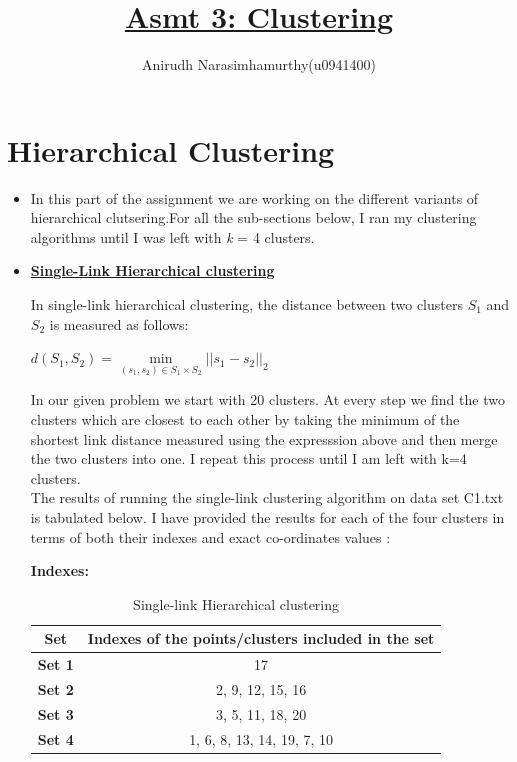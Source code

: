 \documentclass[11pt]{article}
\title{\textbf{\underline{Asmt 3: Clustering}}}
\author{Anirudh Narasimhamurthy(u0941400)}
\begin{document}
\maketitle

\section{Hierarchical Clustering}

\begin{itemize}
	
	
	\item[] In this part of the assignment we are working on the different variants of hierarchical clutsering.For all the sub-sections below, I ran my clustering algorithms until I was left with \emph{k} = 4 clusters. 
	
	\item[] \underline{\textbf{Single-Link Hierarchical clustering}}
	
	In single-link hierarchical clustering, the distance between two clusters $S_1$ and $S_2$ is measured as follows:
	\begin{center}
		$d(S_1,S_2)= \underset{(s_1,s_2) \in S_1 \times S_2}{\min} || s_1 -s_2||_2$
	\end{center}
	
	In our given problem we start with 20 clusters. At every step we find the two clusters which are closest to each other by taking the minimum of the shortest link distance measured using the expresssion above and then merge the two clusters into one. I repeat this process until I am left with k=4 clusters.\\
	
	The results of running the single-link clustering algorithm on data set C1.txt is tabulated below. I have provided the results for each of the four clusters in terms of both their indexes and exact co-ordinates values :
	
	\textbf{Indexes:}
	
	\begin{table}[h]
		\centering
		\begin{tabular}{|c|c|}
			\hline
			\textbf{Set}  & \textbf{Indexes of the points/clusters included in the set} \\
			\hline
			\textbf{Set 1}  & 17\\
			\hline
			\textbf{Set 2} & 2, 9, 12, 15, 16   \\
			\hline
			\textbf{Set 3} &  3, 5, 11, 18, 20    \\
			\hline
			\textbf{Set 4}  & 1, 6, 8, 13, 14, 19, 7, 10   \\
			\hline
		\end{tabular}
		\caption{Single-link Hierarchical clustering }
		\label{t2}
	\end{table}
	

\end{itemize}
\end{document}
